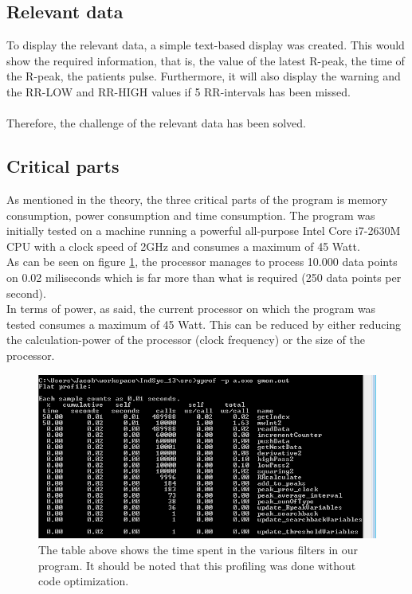 \documentclass[12pt,a4paper]{article}
\begin{document}
\subsection{Relevant data}
	To display the relevant data, a simple text-based display was created. This would show the required information, that is, the value of the latest R-peak, the time of the R-peak, the patients pulse. Furthermore, it will also display the warning and the RR-LOW and RR-HIGH values if 5 RR-intervals has been missed.\\
	\\
	Therefore, the challenge of the relevant data has been solved.
\subsection{Critical parts}
	As mentioned in the theory, the three critical parts of the program is memory consumption, power consumption and time consumption. The program was initially tested on a machine running a powerful all-purpose Intel Core i7-2630M CPU with a clock speed of 2GHz and consumes a maximum of 45 Watt. \\
	As can be seen on figure \ref{time_result}, the processor manages to process 10.000 data points on 0.02 miliseconds which is far more than what is required (250 data points per second).\\
	In terms of power, as said, the current processor on which the program was tested consumes a maximum of 45 Watt. This can be reduced by either reducing the calculation-power of the processor (clock frequency) or the size of the processor.\\
	
	\begin{figure}[h!]
		\centering
			\includegraphics[width=1\textwidth]{Screenshots/time_result.png}
		\caption{The table above shows the time spent in the various filters in our program. It should be noted that this profiling was done without code optimization.}
		\label{time_result}
	\end{figure}
	
\end{document}
